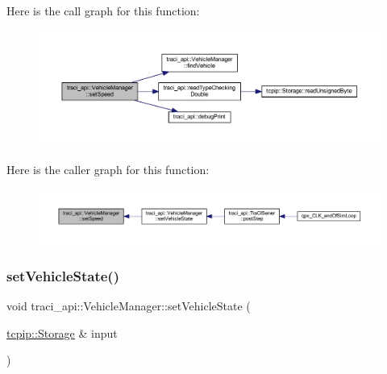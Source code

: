 Here is the call graph for this function\+:\nopagebreak
\begin{figure}[H]
\begin{center}
\leavevmode
\includegraphics[width=350pt]{classtraci__api_1_1_vehicle_manager_a40adaaa7aaaae5708855c6c4715204fe_cgraph}
\end{center}
\end{figure}
Here is the caller graph for this function\+:\nopagebreak
\begin{figure}[H]
\begin{center}
\leavevmode
\includegraphics[width=350pt]{classtraci__api_1_1_vehicle_manager_a40adaaa7aaaae5708855c6c4715204fe_icgraph}
\end{center}
\end{figure}
\mbox{\label{classtraci__api_1_1_vehicle_manager_a7b3c7300d7b091527ed296652701c471}} 
\subsubsection{\texorpdfstring{set\+Vehicle\+State()}{setVehicleState()}}
{\footnotesize\ttfamily void traci\+\_\+api\+::\+Vehicle\+Manager\+::set\+Vehicle\+State (\begin{DoxyParamCaption}\item[{\hyperlink{classtcpip_1_1_storage}{tcpip\+::\+Storage} \&}]{input }\end{DoxyParamCaption})}


